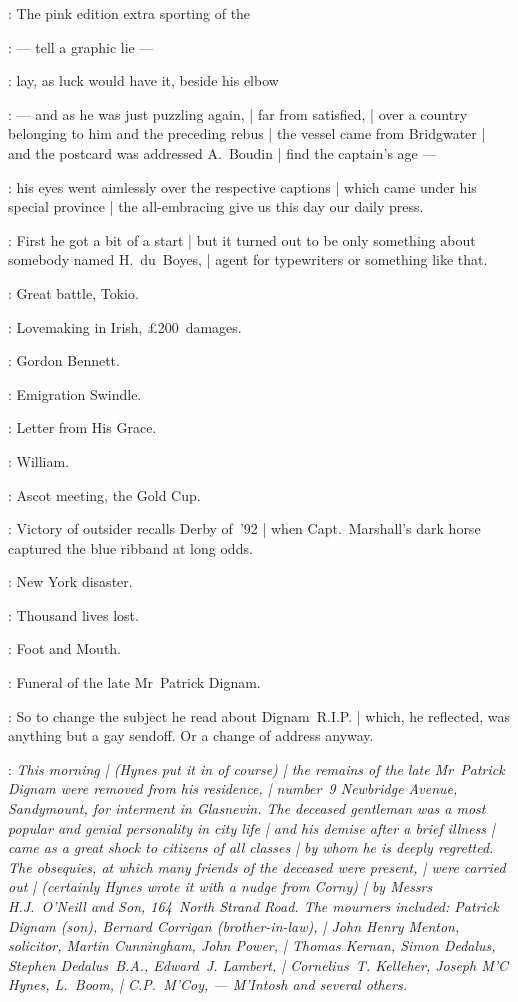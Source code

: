 :
The pink edition extra sporting of the 

:
    --- tell a graphic lie ---

:
lay, as luck would have it, beside his elbow

:
    --- and as he was just puzzling again, |
        far from satisfied, |
        over a country belonging to him and the preceding rebus |
        the vessel came from Bridgwater |
        and the postcard was addressed A.~Boudin |
        find the captain's age ---

:
his eyes went aimlessly over the respective captions |
which came under his special province |
the all-embracing give us this day our daily press.

:
First he got a bit of a start |
but it turned out to be only something about somebody named H.~du~Boyes, |
agent for typewriters or something like that.

:
Great battle, Tokio.

:
Lovemaking in Irish, £200~damages.

:
Gordon Bennett.

:
Emigration Swindle.

:
Letter from His Grace.

:
William.

:
Ascot meeting, the Gold Cup.

:
Victory of outsider  recalls Derby of~'92 |
when Capt.\ Marshall's dark horse  captured the blue ribband at long odds.

:
New York disaster.

:
Thousand lives lost.

:
Foot and Mouth.

:
Funeral of the late Mr~Patrick Dignam.

:
So to change the subject he read about Dignam~R.I.P. |
which, he reflected, was anything but a gay sendoff.
Or a change of address anyway.

\Bloom:
\emph{This morning |
\emph{(Hynes put it in of course)} |
the remains of the late Mr~Patrick Dignam were removed from his residence, |
number~9 Newbridge Avenue, Sandymount, for interment in Glasnevin.
The deceased gentleman was a most popular and genial personality in city life |
and his demise after a brief illness |
came as a great shock to citizens of all classes |
by whom he is deeply regretted.
The obsequies, at which many friends of the deceased were present, |
were carried out |
\emph{(certainly Hynes wrote it with a nudge from Corny)} |
by Messrs H.J.~O'Neill and Son, 164~North Strand Road.
The mourners included: Patrick Dignam (son), Bernard Corrigan (brother-in-law), |
John Henry Menton, solicitor, Martin Cunningham, John Power, |
Thomas Kernan, Simon Dedalus, Stephen Dedalus~B.A., Edward~J. Lambert, |
Cornelius~T. Kelleher, Joseph M'C Hynes, L.~Boom, |
C.P.~M'Coy, --- M'Intosh and several others.}


